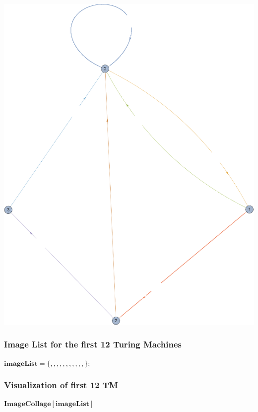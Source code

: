 \documentclass{article}
\begin{document}
\includegraphics{doc_gr1.eps}

\subsubsection*{Image List for the first 12 Turing Machines}

\begin{doublespace}
\noindent\(\pmb{\text{imageList}=\{,,,,,,,,,,,\};}\)
\end{doublespace}

\subsubsection*{Visualization of first 12 TM}

\begin{doublespace}
\noindent\(\pmb{\text{ImageCollage}[\text{imageList}]}\)
\end{doublespace}
\end{document}
